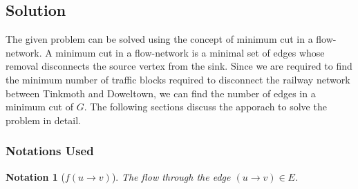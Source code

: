 \documentclass[12pt]{report}
\newtheorem{notation}{Notation}
\begin{document}
    \subsection*{Solution}
    The given problem can be solved using the concept of minimum cut in a flow-network.
    A minimum cut in a flow-network is a minimal set of edges whose removal disconnects the source vertex from the sink.
    Since we are required to find the minimum number of traffic blocks required to disconnect the railway network between Tinkmoth and Doweltown,
    we can find the number of edges in a minimum cut of $G$.
    The following sections discuss the apporach to solve the problem in detail.

    \subsubsection*{Notations Used}
    \begin{notation}[$f(u \to v)$]
        The flow through the edge $(u \to v) \in E$.
    \end{notation}
    \vfill
\end{document}
